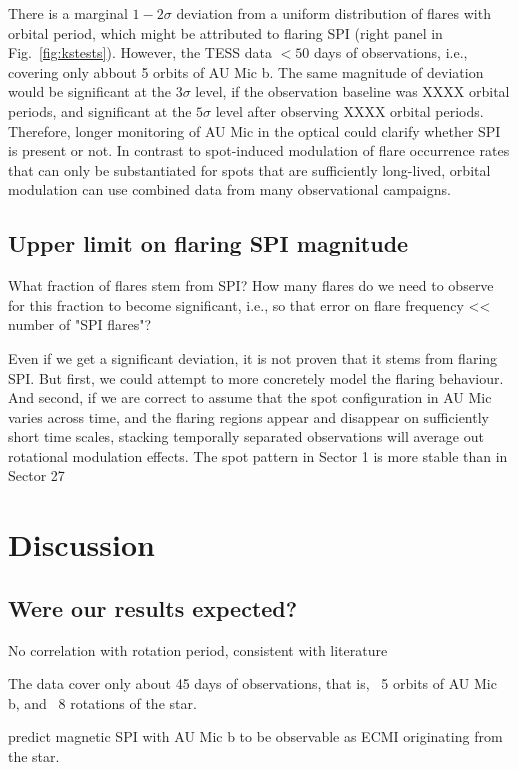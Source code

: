 \documentclass[fleqn,usenatbib,letters]{mnras}%
\begin{document}
There is a marginal $1-2\sigma$ deviation from a uniform distribution of flares with orbital period, which might be attributed to flaring SPI (right panel in Fig.~\ref{fig:kstests}). However, the TESS data $<50$ days of observations, i.e., covering only abbout 5 orbits of AU Mic b. The same magnitude of deviation would be significant at the $3\sigma$ level, if the observation baseline was XXXX orbital periods, and significant at the $5\sigma$ level after observing XXXX orbital periods. Therefore, longer monitoring of AU Mic in the optical could clarify whether SPI is present or not. In contrast to spot-induced modulation of flare occurrence rates that can only be substantiated for spots that are sufficiently long-lived, orbital modulation can use combined data from many observational campaigns. 
\subsection{Upper limit on flaring SPI magnitude}

What fraction of flares stem from SPI? How many flares do we need to observe for this fraction to become significant, i.e., so that error on flare frequency << number of "SPI flares"?

Even if we get a significant deviation, it is not proven that it stems from flaring SPI. But first, we could attempt to more concretely model the flaring behaviour. And second, if we are correct to assume that the spot configuration in AU Mic varies across time, and the flaring regions appear and disappear on sufficiently short time scales, stacking temporally separated observations will average out rotational modulation effects. The spot pattern in Sector 1 is more stable than in Sector 27~\citep{martioli2021}
\section{Discussion}
\subsection{Were our results expected?}
No correlation with rotation period, consistent with literature~\citep{doyle2018, doyle2019}

The data cover only about 45 days of observations, that is, ~5 orbits of AU Mic b, and ~8 rotations of the star.

\citet{kavanagh2021} predict magnetic SPI with AU Mic b to be observable as ECMI originating from the star.  
\end{document}
